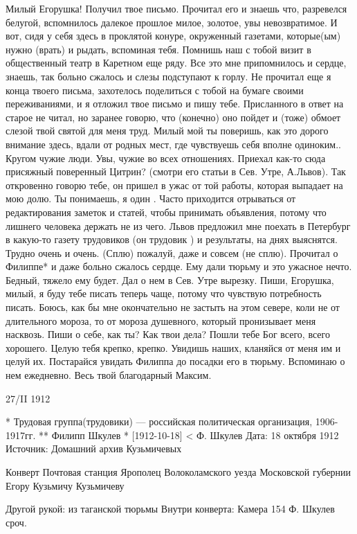 Милый Егорушка!
Получил твое письмо. Прочитал его и знаешь что, разревелся белугой, вспомнилось далекое прошлое милое, золотое, увы невозвратимое. И вот, сидя у себя здесь в проклятой конуре, окруженный газетами, которые(ым) нужно (врать)  и рыдать, вспоминая тебя. Помнишь наш с тобой визит в общественный театр в Каретном еще ряду. Все это мне припомнилось и сердце, знаешь, так больно сжалось и слезы подступают к горлу. Не прочитал еще я конца твоего письма, захотелось поделиться с тобой на бумаге своими переживаниями, и я отложил твое письмо и пишу тебе.  Присланного в ответ на старое не читал, но заранее говорю, что (конечно) оно пойдет и (тоже) обмоет слезой твой святой для меня труд. Милый мой  ты поверишь, как это дорого внимание здесь, вдали от родных мест, где чувствуешь себя вполне одиноким.. Кругом чужие люди. Увы, чужие во всех отношениях. Приехал как-то сюда присяжный поверенный Цитрин? (смотри его статьи в Сев. Утре, А.Львов). Так откровенно говорю тебе, он пришел в ужас от той работы, которая  выпадает на мою долю.  Ты понимаешь, я один . Часто приходится отрываться от редактирования заметок и статей, чтобы принимать объявления, потому что лишнего человека держать не из чего. Львов предложил мне поехать в Петербург в какую-то  газету трудовиков (он трудовик  ) и результаты, на днях выяснятся. Трудно очень и очень. (Сплю)  пожалуй, даже и совсем (не сплю). Прочитал о Филиппе* и даже больно сжалось сердце. Ему дали тюрьму и это ужасное нечто. Бедный, тяжело ему будет. Дал о нем в Сев. Утре вырезку. Пиши, Егорушка, милый, я буду тебе писать теперь чаще, потому что чувствую  потребность писать. Боюсь, как бы мне окончательно не застыть на этом севере, коли не от длительного мороза, то от мороза душевного, который пронизывает меня насквозь.
Пиши о себе, как ты? Как твои дела? Пошли тебе Бог всего, всего хорошего. Целую тебя крепко, крепко. Увидишь наших, кланяйся от меня им и целуй их. Постарайся  увидать Филиппа до посадки его  в тюрьму. Вспоминаю о нем ежедневно. Весь твой благодарный 
                                              Максим.

27/II 1912

 * Трудовая группа(трудовики) — российская политическая организация, 1906-1917гг.
 ** Филипп Шкулев
* [1912-10-18] < Ф. Шкулев 
Дата: 18 октября 1912
Источник: Домашний архив Кузьмичевых

Конверт
Почтовая станция Ярополец
Волоколамского уезда Московской губернии
Егору Кузьмичу Кузьмичеву

Другой рукой: из таганской тюрьмы
Внутри конверта: Камера 154 Ф. Шкулев сроч.

